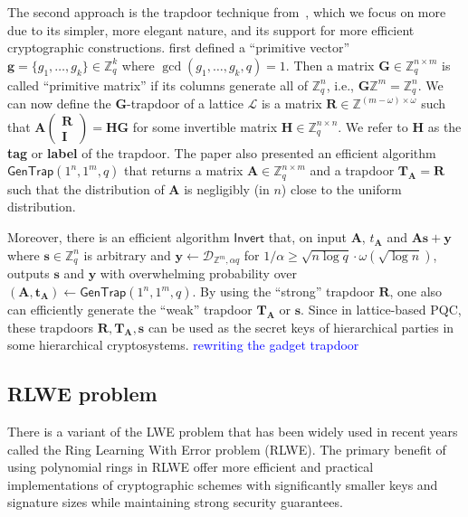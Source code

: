 \documentclass[cryptography,review,submit,pdftex,moreauthors,amsmath,amssymb,aps,strict]{Definitions/mdpi}
\newcommand{\peter}[1]{\textcolor{red}{#1}}
\newcommand{\minh}[1]{\textcolor{blue}{#1}}
\begin{document}
The second approach is the trapdoor technique from~\cite{MP12}, which we focus on more due to its simpler, more elegant nature, and its support for more efficient cryptographic constructions. \cite{MP12} first defined a ``primitive vector'' $\mathbf{g}=\{g_1,\dots,g_k\}\in\mathbb{Z}^k_q$ where $\gcd(g_1,\dots,g_k,q)=1$. Then
a matrix $\mathbf{G}\in\mathbb{Z}^{n\times m}_q$ is called ``primitive matrix'' if its columns generate all of $\mathbb{Z}^n_q$, i.e., $\mathbf{G}\mathbb{Z}^m=\mathbb{Z}^n_q$. We can now define the $\mathbf{G}$-trapdoor of a lattice $\mathcal{L}$ is a matrix $\mathbf{R}\in\mathbb{Z}^{(m-\omega)\times \omega}$ such that $\mathbf{A}\begin{pmatrix}
    \mathbf{R}\\ 
    \mathbf{I}
  \end{pmatrix} = \mathbf{H}\mathbf{G}$ for some invertible matrix $\mathbf{H}\in\mathbb{Z}^{n\times n}_q$. We refer to $\mathbf{H}$ as the \textbf{tag} or \textbf{label} of the trapdoor. The paper also presented an efficient algorithm $\mathsf{GenTrap}(1^n,1^m,q)$ that returns a matrix $\mathbf{A}\in\mathbb{Z}^{n\times m}_q$ and a trapdoor $\mathbf{T}_{\mathbf{A}}=\mathbf{R}$ such that the distribution of $\mathbf{A}$ is negligibly (in $n$) close to the uniform distribution. 

Moreover, there is an efficient algorithm $\mathsf{Invert}$ that, on input $\mathbf{A}$, $t_{\mathbf{A}}$ and $\mathbf{A}\mathbf{s}+\mathbf{y}$ where $\mathbf{s}\in\mathbb{Z}^n_q$ is arbitrary and $\mathbf{y}\gets \mathcal{D}_{\mathbb{Z}^m,\alpha q}$ for $1/\alpha \geq \sqrt{n\log q}\cdot \omega(\sqrt{\log n})$, outputs $\mathbf{s}$ and $\mathbf{y}$ with overwhelming probability over $(\mathbf{A},\mathbf{t}_{\mathbf{A}})\gets \mathsf{GenTrap}(1^n,1^m,q)$. By using the ``strong'' trapdoor $\mathbf{R}$, one also can efficiently generate the ``weak'' trapdoor $\mathbf{T}_{\mathbf{A}}$ or $\mathbf{s}$. Since in lattice-based PQC, these trapdoors $\mathbf{R},\mathbf{T}_{\mathbf{A}}, \mathbf{s}$ can be used as the secret keys of hierarchical parties in some hierarchical cryptosystems.
\minh{rewriting the gadget trapdoor}

\subsection{RLWE problem}

There is a variant of the LWE problem that has been widely used in recent years called the Ring Learning With Error problem (RLWE). The primary benefit of using polynomial rings in RLWE offer more efficient and practical implementations of cryptographic schemes with significantly smaller keys and signature sizes while maintaining strong security guarantees.
\end{document}
